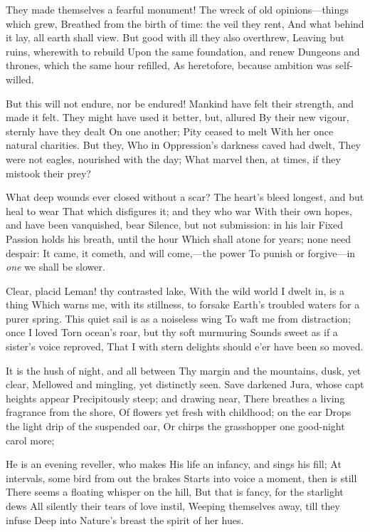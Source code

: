 \documentclass[10pt,twocolumn]{book}
\begin{document}
   They made themselves a fearful monument!
   The wreck of old opinions---things which grew,
   Breathed from the birth of time:  the veil they rent,
   And what behind it lay, all earth shall view.
   But good with ill they also overthrew,
   Leaving but ruins, wherewith to rebuild
   Upon the same foundation, and renew
   Dungeons and thrones, which the same hour refilled,
As heretofore, because ambition was self-willed.


   But this will not endure, nor be endured!
   Mankind have felt their strength, and made it felt.
   They might have used it better, but, allured
   By their new vigour, sternly have they dealt
   On one another; Pity ceased to melt
   With her once natural charities.  But they,
   Who in Oppression's darkness caved had dwelt,
   They were not eagles, nourished with the day;
What marvel then, at times, if they mistook their prey?


   What deep wounds ever closed without a scar?
   The heart's bleed longest, and but heal to wear
   That which disfigures it; and they who war
   With their own hopes, and have been vanquished, bear
   Silence, but not submission:  in his lair
   Fixed Passion holds his breath, until the hour
   Which shall atone for years; none need despair:
   It came, it cometh, and will come,---the power
To punish or forgive---in \textit{one} we shall be slower.


   Clear, placid Leman! thy contrasted lake,
   With the wild world I dwelt in, is a thing
   Which warns me, with its stillness, to forsake
   Earth's troubled waters for a purer spring.
   This quiet sail is as a noiseless wing
   To waft me from distraction; once I loved
   Torn ocean's roar, but thy soft murmuring
   Sounds sweet as if a sister's voice reproved,
That I with stern delights should e'er have been so moved.


   It is the hush of night, and all between
   Thy margin and the mountains, dusk, yet clear,
   Mellowed and mingling, yet distinctly seen.
   Save darkened Jura, whose capt heights appear
   Precipitously steep; and drawing near,
   There breathes a living fragrance from the shore,
   Of flowers yet fresh with childhood; on the ear
   Drops the light drip of the suspended oar,
Or chirps the grasshopper one good-night carol more;


   He is an evening reveller, who makes
   His life an infancy, and sings his fill;
   At intervals, some bird from out the brakes
   Starts into voice a moment, then is still
   There seems a floating whisper on the hill,
   But that is fancy, for the starlight dews
   All silently their tears of love instil,
   Weeping themselves away, till they infuse
Deep into Nature's breast the spirit of her hues.
\end{document}
